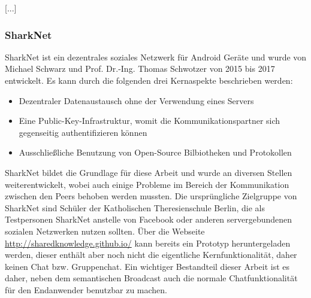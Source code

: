 [...]

\subsubsection{SharkNet}

SharkNet ist ein dezentrales soziales Netzwerk für Android Geräte und wurde von Michael Schwarz und Prof. Dr.-Ing. Thomas Schwotzer von 2015 bis 2017 entwickelt. Es kann durch die folgenden drei Kernaspekte beschrieben werden:
\begin{itemize}
	\item Dezentraler Datenaustausch ohne der Verwendung eines Servers
	\item Eine Public-Key-Infrastruktur, womit die Kommunikationspartner sich gegenseitig authentifizieren können
	\item Ausschließliche Benutzung von Open-Source Bilbiotheken und Protokollen
\end{itemize}
SharkNet bildet die Grundlage für diese Arbeit und wurde an diversen Stellen weiterentwickelt, wobei auch einige Probleme im Bereich der Kommunikation zwischen den Peers behoben werden mussten. Die ursprüngliche Zielgruppe von SharkNet sind Schüler der Katholischen Theresienschule Berlin, die als Testpersonen SharkNet anstelle von Facebook oder anderen servergebundenen sozialen Netzwerken nutzen sollten. Über die Webseite \url{http://sharedknowledge.github.io/} kann bereits ein Prototyp heruntergeladen werden, dieser enthält aber noch nicht die eigentliche Kernfunktionalität, daher keinen Chat bzw. Gruppenchat. Ein wichtiger Bestandteil dieser Arbeit ist es daher, neben dem semantischen Broadcast auch die normale Chatfunktionalität für den Endanwender benutzbar zu machen.  
\newline[...]
\newpage



